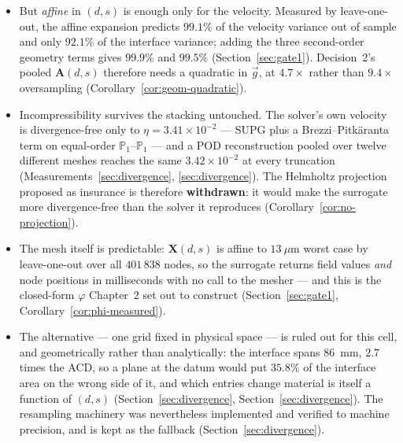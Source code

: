 \documentclass[11pt,a4paper]{article}
\newcommand{\vect}[1]{\mathbf{#1}}
\theoremstyle{plain}
\theoremstyle{definition}
\theoremstyle{remark}
\begin{document}
\begin{itemize}
its written threshold in the third decimal place, which is not a distinction
twelve snapshots can support (Section~\ref{sec:gate1}).
\item But \emph{affine} in $(d,s)$ is enough only for the velocity. Measured by
leave-one-out, the affine expansion predicts $99.1\%$ of the velocity variance
out of sample and only $92.1\%$ of the interface variance; adding the three
second-order geometry terms gives $99.9\%$ and $99.5\%$
(Section~\ref{sec:gate1}). Decision~2's pooled
$\vect{A}(d,s)$ therefore needs a quadratic in $\vec g$, at $4.7\times$ rather
than $9.4\times$ oversampling (Corollary~\ref{cor:geom-quadratic}).
\item Incompressibility survives the stacking untouched. The solver's own
velocity is divergence-free only to $\eta = 3.41\times10^{-2}$ --- SUPG plus a
Brezzi--Pitkäranta term on equal-order $\mathbb{P}_1$--$\mathbb{P}_1$ --- and a
POD reconstruction pooled over twelve different meshes reaches the same
$3.42\times10^{-2}$ at every truncation (Measurements~\ref{sec:divergence},
\ref{sec:divergence}). The Helmholtz projection proposed as insurance is
therefore \textbf{withdrawn}: it would make the surrogate more divergence-free
than the solver it reproduces (Corollary~\ref{cor:no-projection}).
\item The mesh itself is predictable: $\vect{X}(d,s)$ is affine to $13\ \mu$m
worst case by leave-one-out over all $401\,838$ nodes, so the surrogate returns
field values \emph{and} node positions in milliseconds with no call to the
mesher --- and this is the closed-form $\varphi$ Chapter~2 set out to construct
(Section~\ref{sec:gate1}, Corollary~\ref{cor:phi-measured}).
\item The alternative --- one grid fixed in physical space --- is ruled out for
this cell, and geometrically rather than analytically: the interface spans
$86$~mm, $2.7$ times the ACD, so a plane at the datum would put $35.8\%$ of the
interface area on the wrong side of it, and which entries change material is itself a
function of $(d,s)$ (Section~\ref{sec:divergence},
Section~\ref{sec:divergence}). The resampling machinery was nevertheless
implemented and verified to machine precision, and is kept as the fallback
(Section~\ref{sec:divergence}).
\end{itemize}
\end{document}

